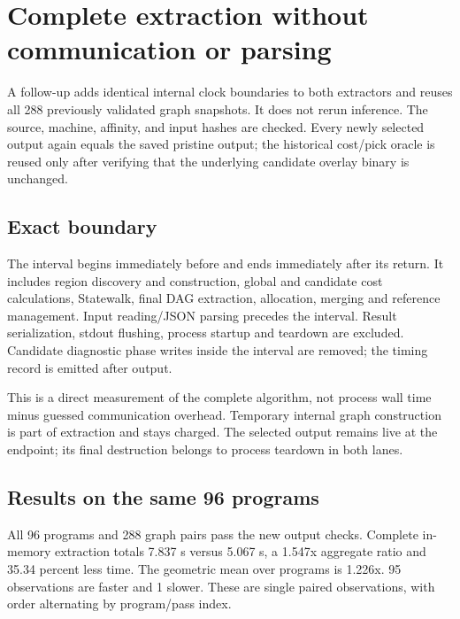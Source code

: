 \section{Complete extraction without communication or parsing}

A follow-up adds identical internal clock boundaries to both extractors and reuses all 288 previously validated graph snapshots. It does not rerun inference. The source, machine, affinity, and input hashes are checked. Every newly selected output again equals the saved pristine output; the historical cost/pick oracle is reused only after verifying that the underlying candidate overlay binary is unchanged.

\subsection{Exact boundary}

The interval begins immediately before  and ends immediately after its return. It includes region discovery and construction, global and candidate cost calculations, Statewalk, final DAG extraction, allocation, merging and reference management. Input reading/JSON parsing precedes the interval. Result serialization, stdout flushing, process startup and teardown are excluded. Candidate diagnostic phase writes inside the interval are removed; the timing record is emitted after output.

This is a direct measurement of the complete algorithm, not process wall time minus guessed communication overhead. Temporary internal graph construction is part of extraction and stays charged. The selected output remains live at the endpoint; its final destruction belongs to process teardown in both lanes.

\subsection{Results on the same 96 programs}

All 96 programs and 288 graph pairs pass the new output checks. Complete in-memory extraction totals 7.837 s versus 5.067 s, a 1.547x aggregate ratio and 35.34 percent less time. The geometric mean over programs is 1.226x. 95 observations are faster and 1 slower. These are single paired observations, with order alternating by program/pass index.

